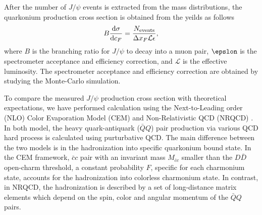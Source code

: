 \documentclass[10pt, a4paper,final]{article}
\begin{document}
After the number of $J/\psi$ events is extracted from the mass distributions,
the quarkonium production cross section is obtained from the yeilds as follows
\begin{equation}
	B\dv{\sigma}{c_F} = \frac{N_{\textrm{events}}}{\Delta x_F \mathcal{L} \epsilon},
\end{equation}
where $B$ is the branching ratio for $J/\psi$ to decay into a muon pair,
$\epslon$ is the spectrometer acceptance and efficiency correction, and
$\mathcal{L}$ is the effective luminosity. The spectrometer acceptance and
efficiency correction are obtained by studying the Monte-Carlo simulation.

To compare the measured $J/\psi$ production cross section with theoretical
expectations, we have performed calculation using the Next-to-Leading
order (NLO) Color Evaporation Model (CEM)\cite{mangano1993} and
Non-Relativistic QCD (NRQCD) \cite{bodwin1997}. In both model, the heavy
quark-antiquark ($\bar{Q}Q$) pair production via various QCD hard process
is calculated using purturbative QCD. The main difference between the two
models is in the hadronization into specific quarkonium bound state.
In the CEM framework, $\bar{c}c$ pair with an invariant mass $M_{\bar{c}c}$
smaller than the $D\bar{D}$ open-charm threshold, a constant probability $F$,
specific for each charmonium state, accounts for the hadronization into
colorless charmonium state. In contrast, in NRQCD, the hadronization is
described by a set of long-distance matrix elements which depend on the spin,
color and angular momentum of the $\bar{Q}Q$ pairs.
\end{document}
